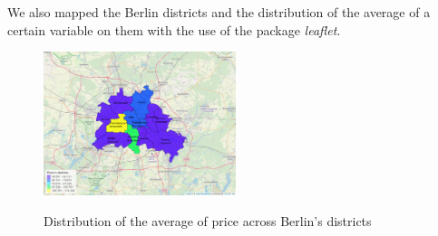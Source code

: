 We also mapped the Berlin districts and the distribution of the average of a certain variable on them with the use of the package \textit{leaflet}.

\begin{figure}[H]
\begin{center}
\includegraphics[width=0.5\textwidth, keepaspectratio]{price_map_distr} \\
\caption{Distribution of the average of price across Berlin's districts}
\label{figure:room_type}
\end{center}
\end{figure}